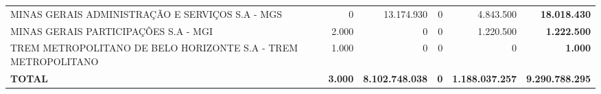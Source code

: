 \documentclass{article}
\begin{document}
\begin{longtable}[c]{m{5.5cm}|m{2.5cm}|m{2.5cm}|m{2.5cm}|m{2cm}|m{2cm}}
\multicolumn{1}{L{5.5cm}|}{MINAS GERAIS ADMINISTRAÇÃO E SERVIÇOS S.A - MGS} & \multicolumn{1}{r|}{    0} & \multicolumn{1}{r|}{13.174.930} & \multicolumn{1}{r|}{0} & \multicolumn{1}{r|}{4.843.500} & \multicolumn{1}{r}{ \textbf{18.018.430}} \\
\multicolumn{1}{L{5.5cm}|}{MINAS GERAIS PARTICIPAÇÕES S.A - MGI} & \multicolumn{1}{r|}{2.000} & \multicolumn{1}{r|}{            0} & \multicolumn{1}{r|}{0} & \multicolumn{1}{r|}{1.220.500} & \multicolumn{1}{r}{ \textbf{1.222.500}} \\
\multicolumn{1}{L{5.5cm}|}{TREM METROPOLITANO DE BELO HORIZONTE S.A - TREM METROPOLITANO} & \multicolumn{1}{r|}{1.000} & \multicolumn{1}{r|}{            0} & \multicolumn{1}{r|}{0} & \multicolumn{1}{r|}{            0} & \multicolumn{1}{r}{ \textbf{1.000}} \\
\hline
\multicolumn{1}{L{5.5cm}|}{ \textbf{TOTAL}} & \multicolumn{1}{r|}{ \textbf{3.000}} & \multicolumn{1}{r|}{ \textbf{8.102.748.038}} & \multicolumn{1}{r|}{ \textbf{0}} & \multicolumn{1}{r|}{ \textbf{1.188.037.257}} & \multicolumn{1}{r}{ \textbf{9.290.788.295}} \\\end{longtable}
\end{document}
